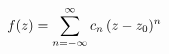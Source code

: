 \documentclass[preview]{standalone}
\begin{document}
\begin{align*}
\special{dvisvgm:raw <g id='unique000'>}f(z) = \sum_{n=-\infty}^{\infty} c_n\,(z-z_0)^n\special{dvisvgm:raw </g>}
\end{align*}
\end{document}
